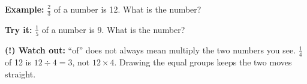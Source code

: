 \documentclass[12pt]{article}
\begin{document}
\begin{examplebox}
\textbf{Example:} \quad $\tfrac{2}{3}$ of a number is 12. What is the number?
\end{examplebox}

\begin{tryitbox}
\textbf{Try it:} \quad $\tfrac{1}{5}$ of a number is 9. What is the
number?\\[2pt]
\end{tryitbox}

\begin{watchoutbox}
\textbf{(!) Watch out:} ``of'' does not always mean multiply the two numbers
you see. $\tfrac{1}{4}$ of 12 is $12 \div 4 = 3$, not $12 \times 4$.
Drawing the equal groups keeps the two moves straight.
\end{watchoutbox}
\end{document}
